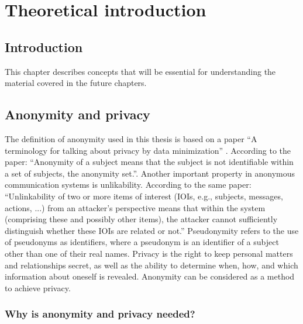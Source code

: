 \chapter{Theoretical introduction}


\section{Introduction}
This chapter describes concepts that will be essential for understanding the material covered in the future chapters.

\section{Anonymity and privacy}
The definition of anonymity used in this thesis is based on a paper “A terminology for talking about privacy by data minimization” \cite{anon-terminology}.
According to the paper: “Anonymity of a subject means that the subject is not identifiable within a set of subjects, the anonymity set.”. Another important property in anonymous communication systems is unlikability. According to the same paper: “Unlinkability of two or more items of interest (IOIs, e.g., subjects, messages, actions, ...) from an attacker’s perspective means that within the system (comprising these and possibly other items), the attacker cannot sufficiently distinguish whether these IOIs are related or not.”
Pseudonymity refers to the use of pseudonyms as identifiers, where a pseudonym is an identifier of a subject other than one of their real names.
Privacy is the right to keep personal matters and relationships secret, as well as the ability to determine when, how, and which information about oneself is revealed.
Anonymity can be considered as a method to achieve privacy.

\subsection{Why is anonymity and privacy needed?}

